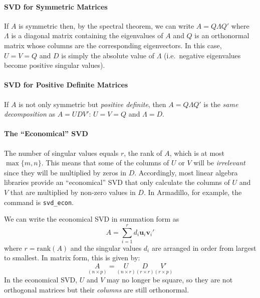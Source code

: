 \paragraph{SVD for Symmetric Matrices} If $A$ is symmetric then, by the spectral theorem, we can write $A = Q\Lambda Q'$ where $\Lambda$ is a diagonal matrix containing the eigenvalues of $A$ and $Q$ is an orthonormal matrix whose columns are the corresponding eigenvectors. In this case, $U = V = Q$ and $D$ is simply the absolute value of $\Lambda$ (i.e.\ negative eigenvalues become positive singular values).

\paragraph{SVD for Positive Definite Matrices} If $A$ is not only symmetric but \emph{positive definite}, then $A = Q\Lambda Q'$ is the \emph{same decomposition} as $A = UDV'$: $U=V=Q$ and $\Lambda = D$.

\paragraph{The ``Economical'' SVD}
The number of singular values equals $r$, the rank of $A$, which is at most $\max\{m,n\}$. This means that some of the columns of $U$ or $V$ will be \emph{irrelevant} since they will be multiplied by zeros in $D$. Accordingly, most linear algebra libraries provide an ``economical'' SVD that only calculate the columns of $U$ and $V$ that are multiplied by non-zero values in $D$. In Armadillo, for example, the command is \texttt{svd\_econ}. 

We can write the economical SVD in summation form as 
	$$A = \sum_{i=1}^r d_i \textbf{u}_i \textbf{v}_i'$$
where $r = \mbox{rank}(A)$ and the singular values $d_i$ are arranged in order from largest to smallest. In matrix form, this is given by:
	$$\underset{(n\times p)}{A} = \underset{(n\times r)}{U} \underset{(r\times r)}{D} \underset{(r\times p)}{V'}$$
In the economical SVD, $U$ and $V$ may no longer be square, so they are not orthogonal matrices but their \emph{columns} are still orthonormal.

